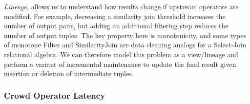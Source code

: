 \textit{Lineage.} allows us to understand how results change if upstream operators are modified.
For example, decreasing a similarity join threshold increases the number of output pairs, but adding an additional filtering step 
reduces the number of output tuples. The key property here is monotonicity, and some types of monotone \textsf{Filter} and \textsf{SimilarityJoin} are data cleaning analogs for a Select-Join relational algebra.
We can therefore model this problem as a view/lineage and perform a variant of incremental maintenance to update the 
final result given insertion or deletion of intermediate tuples.

\iffalse
\vspace{.5em}

{\noindent \bf Cost Estimates:} Of course, changing plans when using crowdsourcing may significantly change its cost.
For every recommendation, we estimate the number of additional tuples processed by the crowd operators and provide 
the user with an estimated cost.

\fi



\vspace{-0.2cm}
\subsubsection{Crowd Operator Latency}
\vspace{.2em}

